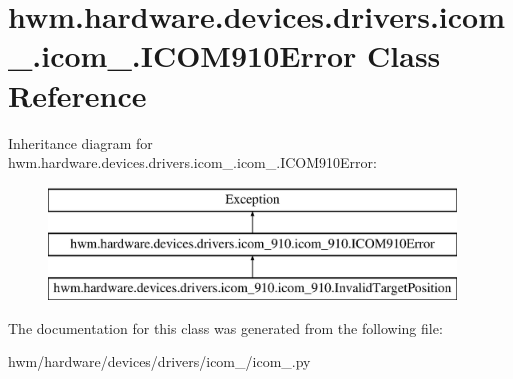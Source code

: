 \hypertarget{classhwm_1_1hardware_1_1devices_1_1drivers_1_1icom__910_1_1icom__910_1_1_i_c_o_m910_error}{\section{hwm.\-hardware.\-devices.\-drivers.\-icom\-\_.\-icom\-\_.\-I\-C\-O\-M910\-Error Class Reference}
\label{classhwm_1_1hardware_1_1devices_1_1drivers_1_1icom__910_1_1icom__910_1_1_i_c_o_m910_error}
}
Inheritance diagram for hwm.\-hardware.\-devices.\-drivers.\-icom\-\_.\-icom\-\_.\-I\-C\-O\-M910\-Error\-:\begin{figure}[H]
\begin{center}
\leavevmode
\includegraphics[height=3.000000cm]{classhwm_1_1hardware_1_1devices_1_1drivers_1_1icom__910_1_1icom__910_1_1_i_c_o_m910_error}
\end{center}
\end{figure}


The documentation for this class was generated from the following file\-:\begin{DoxyCompactItemize}
\item 
hwm/hardware/devices/drivers/icom\-\_/icom\-\_.\-py\end{DoxyCompactItemize}

